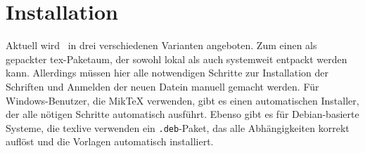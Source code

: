 \chapter{Installation}

Aktuell wird \tubslatex\ in drei verschiedenen Varianten angeboten.
Zum einen als gepackter tex-Paketaum, der sowohl lokal als auch systemweit
entpackt werden kann. Allerdings müssen hier alle notwendigen Schritte zur 
Installation der Schriften und Anmelden der neuen Datein manuell gemacht werden.
Für Windows-Benutzer, die MikTeX verwenden, gibt es einen automatischen
Installer, der alle nötigen Schritte automatisch ausführt.
Ebenso gibt es für Debian-basierte Systeme, die texlive verwenden ein
\texttt{.deb}-Paket, das alle Abhängigkeiten korrekt auflöst und die Vorlagen
automatisch installiert.

